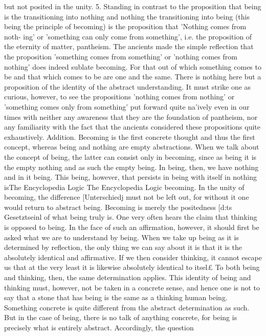 but not posited in the unity.
5. Standing in contrast to the proposition that being is the transitioning
into nothing and nothing the transitioning into being (this being the
principle of becoming) is the proposition that 'Nothing comes from noth-
ing' or 'something can only come from something', i.e. the proposition
of the eternity of matter, pantheism. The ancients made the simple
reflection that the proposition 'something comes from something' or
'nothing comes from nothing' does indeed sublate becoming. For that
out of which something comes to be and that which comes to be are one
and the same. There is nothing here but a proposition of the identity
of the abstract understanding. It must strike one as curious, however, to
see the propositions 'nothing comes from nothing' or 'something comes
only from something' put forward quite na'ively even in our times with
neither any awareness that they are the foundation of pantheism, nor any
familiarity with the fact that the ancients considered these propositions
quite exhaustively.
Addition. Becoming is the first concrete thought and thus the first concept,
whereas being and nothing are empty abstractions. When we talk about the
concept of being, the latter can consist only in becoming, since as being it is the
empty nothing and as such the empty being. In being, then, we have nothing and
in it being. This being, however, that persists in being with itself in nothing isThe Encyclopedia Logic The Encyclopedia Logic
becoming. In the unity of becoming, the difference [Unterschiedj must not be left
out, for without it one would return to abstract being. Becoming is merely the
positedness [d:ts Gesetztseinl of what being truly is.
One very often hears the claim that thinking is opposed to being. In the face of
such an affirmation, however, it should first be asked what we are to understand
by being. When we take up being as it is determined by reflection, the only thing
we can say about it is that it is the absolutely identical and affirmative. If we then
consider thinking, it cannot escape us that at the very least it is likewise absolutely
identical to itsel£ To both being and thinking, then, the same determination
applies. This identity of being and thinking must, however, not be taken in a
concrete sense, and hence one is not to say that a stone that has being is the
same as a thinking human being. Something concrete is quite different from the
abstract determination as such. But in the case of being, there is no talk of anything
concrete, for being is precisely what is entirely abstract. Accordingly, the question
